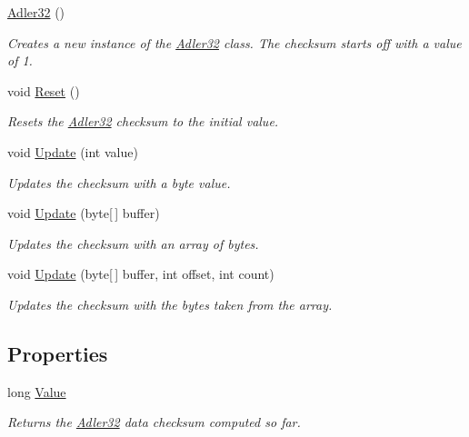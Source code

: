 \begin{DoxyCompactItemize}
\hyperlink{class_i_c_sharp_code_1_1_sharp_zip_lib_1_1_checksums_1_1_adler32_a972862f4f9c1bad593b4da0318299279}{Adler32} ()
\begin{DoxyCompactList}\small\item\em Creates a new instance of the \hyperlink{class_i_c_sharp_code_1_1_sharp_zip_lib_1_1_checksums_1_1_adler32}{Adler32} class. The checksum starts off with a value of 1. \end{DoxyCompactList}\item 
void \hyperlink{class_i_c_sharp_code_1_1_sharp_zip_lib_1_1_checksums_1_1_adler32_ab508a341e82f164dfbb744188614caeb}{Reset} ()
\begin{DoxyCompactList}\small\item\em Resets the \hyperlink{class_i_c_sharp_code_1_1_sharp_zip_lib_1_1_checksums_1_1_adler32}{Adler32} checksum to the initial value. \end{DoxyCompactList}\item 
void \hyperlink{class_i_c_sharp_code_1_1_sharp_zip_lib_1_1_checksums_1_1_adler32_ae37b99f42678909be303136f2995b572}{Update} (int value)
\begin{DoxyCompactList}\small\item\em Updates the checksum with a byte value. \end{DoxyCompactList}\item 
void \hyperlink{class_i_c_sharp_code_1_1_sharp_zip_lib_1_1_checksums_1_1_adler32_a37a55dd34c64e5b9ea40ef50a6e23afd}{Update} (byte\mbox{[}$\,$\mbox{]} buffer)
\begin{DoxyCompactList}\small\item\em Updates the checksum with an array of bytes. \end{DoxyCompactList}\item 
void \hyperlink{class_i_c_sharp_code_1_1_sharp_zip_lib_1_1_checksums_1_1_adler32_ad1fb412ee9a03ff079da149d0c06d0f6}{Update} (byte\mbox{[}$\,$\mbox{]} buffer, int offset, int count)
\begin{DoxyCompactList}\small\item\em Updates the checksum with the bytes taken from the array. \end{DoxyCompactList}\end{DoxyCompactItemize}
\subsection*{Properties}
\begin{DoxyCompactItemize}
\item 
long \hyperlink{class_i_c_sharp_code_1_1_sharp_zip_lib_1_1_checksums_1_1_adler32_aea4fd0d2f779009b33b4a780288db179}{Value}
\begin{DoxyCompactList}\small\item\em Returns the \hyperlink{class_i_c_sharp_code_1_1_sharp_zip_lib_1_1_checksums_1_1_adler32}{Adler32} data checksum computed so far. \end{DoxyCompactList}\end{DoxyCompactItemize}


